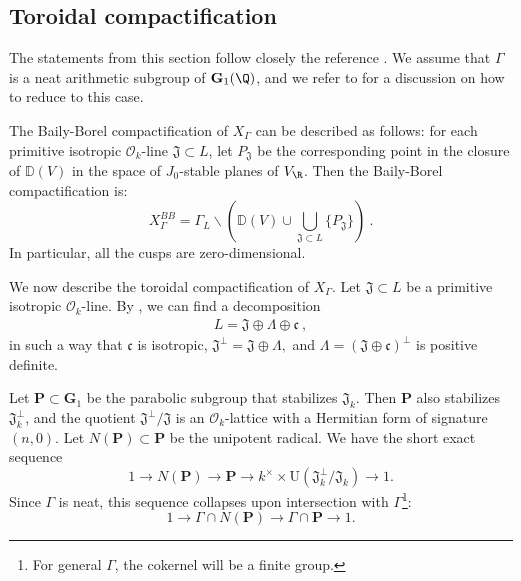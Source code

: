 \documentclass[11pt,letterpaper,english]{amsart}
\numberwithin{equation}{subsection}
\numberwithin{equation}{section}
\newcommand\fJ{{\mathfrak J}}
\newcommand\bfG{{\mathbf G}}
\newcommand\bfP{{\mathbf P}}
\theoremstyle{plain}
\theoremstyle{remark}
\begin{document}
\subsection{Toroidal compactification}\label{boundary}
The statements from this section follow closely the reference \cite[Section 3.3]{howard-CMII}. We assume that $\Gamma$ is a neat arithmetic subgroup of $\bfG_1(\Q)$, and we refer to  for a discussion on how to reduce to this case. 
\medskip 

The Baily-Borel compactification of $X_\Gamma$ can be described as follows: for each primitive isotropic $\mathcal{O}_k$-line $\mathfrak{J}\subset L$, let $P_{\mathfrak{J}}$ be the corresponding point in the closure of $\mathbb D(V)$ in the space of $J_0$-stable planes of $V_\R$. Then the Baily-Borel compactification is:
\[X_\Gamma^{BB}=\Gamma_L\backslash\left(\mathbb D(V)\cup\bigcup_{\mathfrak{J}\subset L}\{P_\mathfrak J\}\right)~.\]
In particular, all the cusps are zero-dimensional. 
\medskip 


We now describe the toroidal compactification of $X_\Gamma$. 
Let $\mathfrak{J}\subset L$ be a primitive isotropic $\mathcal{O}_k$-line. By \cite[pp. 671-672]{howard-CMII},  we can find a decomposition 
\begin{align}\label{decomposition}
    L=\mathfrak{J}\oplus \Lambda\oplus \mathfrak{c}~,
\end{align}
in such a way that $\mathfrak{c}$ is isotropic, $\mathfrak{J}^{\bot}=\mathfrak{J}\oplus \Lambda,$ and $\Lambda=(\mathfrak J\oplus \mathfrak c)^{\bot}$ is positive definite.%

Let $\bfP\subset \bfG_1$ be the parabolic subgroup that stabilizes $\fJ_k$. Then $\bfP$ also stabilizes $\mathfrak J_k^{\bot}$, and the quotient $\mathfrak J^{\bot}/\mathfrak J$ is an $\mathcal{O}_k$-lattice with a Hermitian form of signature $(n,0)$. Let $N(\bfP)\subset \bfP$ be the unipotent radical. We have the short exact sequence
$$1 \to N(\bfP) \to \bfP  \to k^\times \times \mathrm{U}(\mathfrak J_k^\perp/\mathfrak J_k) \to 1.$$
Since $\Gamma$ is neat, this sequence collapses upon intersection with $\Gamma$\footnote{For general $\Gamma$, the cokernel will be a finite group.}:
$$1 \to \Gamma\cap N(\bfP ) \to \Gamma\cap \bfP \to 1.$$
\end{document}
